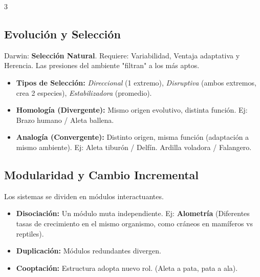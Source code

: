 \documentclass[11pt,landscape,letterpaper]{extarticle}
\begin{document}
\begin{multicols*}{3}
	\subsection{Evolución y Selección}
	Darwin: \textbf{Selección Natural}. Requiere: Variabilidad, Ventaja adaptativa y Herencia. Las presiones del ambiente "filtran" a los más aptos.
	\begin{itemize}
		\item \textbf{Tipos de Selección:} \textit{Direccional} (1 extremo), \textit{Disruptiva} (ambos extremos, crea 2 especies), \textit{Estabilizadora} (promedio).
		\item \textbf{Homología (Divergente):} Mismo origen evolutivo, distinta función. Ej: Brazo humano / Aleta ballena.
		\item \textbf{Analogía (Convergente):} Distinto origen, misma función (adaptación a mismo ambiente). Ej: Aleta tiburón / Delfín. Ardilla voladora / Falangero.
	\end{itemize}

	\subsection{Modularidad y Cambio Incremental}
	Los sistemas se dividen en módulos interactuantes.
	\begin{itemize}
		\item \textbf{Disociación:} Un módulo muta independiente. Ej: \textbf{Alometría} (Diferentes tasas de crecimiento en el mismo organismo, como cráneos en mamíferos vs reptiles).
		\item \textbf{Duplicación:} Módulos redundantes divergen.
		\item \textbf{Cooptación:} Estructura adopta nuevo rol. (Aleta a pata, pata a ala).
	\end{itemize}


\end{multicols*}
\end{document}
